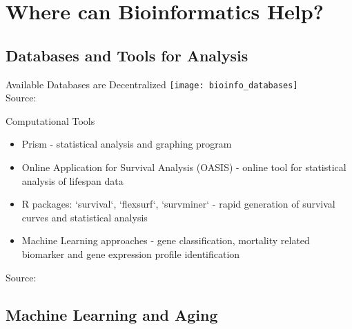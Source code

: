 \section{Where can Bioinformatics Help?}

\subsection{Databases and Tools for Analysis}

\begin{frame}[c]{Available Databases are Decentralized}
    \scriptsize
    \texttt{[image: bioinfo\_databases]} \\
    Source: \cite{kruempel2019computational}
\end{frame}


\begin{frame}[c]{Computational Tools}
    \begin{itemize}[<+(1)->]
        \item Prism - statistical analysis and graphing program
        \item Online Application for Survival Analysis (OASIS) - online tool for statistical analysis of lifespan data
        \item R packages: `survival`, `flexsurf`, `survminer` - rapid generation of survival curves and statistical analysis
        \item Machine Learning approaches - gene classification, mortality related biomarker and gene expression profile identification
    \end{itemize}
    \pause
    \scriptsize
    Source: \cite{kruempel2019computational}
\end{frame}


\subsection{Machine Learning and Aging}

